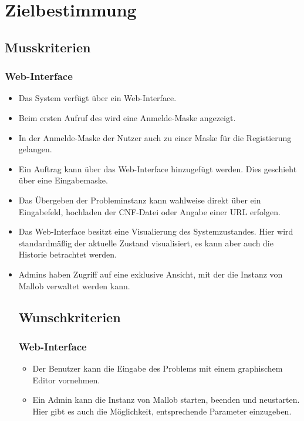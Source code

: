 \section{Zielbestimmung}
\subsection{Musskriterien}
\subsubsection{Web-Interface}
\begin{itemize}
    \item Das System verfügt über ein \gls{Web-Interface}.
    \item Beim ersten Aufruf des  wird eine Anmelde-Maske angezeigt.
    \item In der Anmelde-Maske der Nutzer auch zu einer Maske für die Registierung gelangen.
    \item Ein \gls{Auftrag} kann über das \gls{Web-Interface} hinzugefügt werden. Dies geschieht über eine Eingabemaske.
    \item Das Übergeben der Probleminstanz kann wahlweise direkt über ein Eingabefeld, hochladen der CNF-Datei oder Angabe einer URL erfolgen.
    \item Das \gls{Web-Interface} besitzt eine Visualierung des Systemzustandes. Hier wird standardmäßig der aktuelle Zustand visualisiert,  es kann aber auch die Historie betrachtet werden.
    \item Admins haben Zugriff auf eine exklusive Ansicht, mit der die Instanz von Mallob verwaltet werden kann.

\subsection{Wunschkriterien}
\subsubsection{Web-Interface}
\begin{itemize}
    \item Der Benutzer kann die Eingabe des Problems mit einem graphischem Editor vornehmen.
    \item Ein Admin kann die Instanz von Mallob starten, beenden und neustarten. Hier gibt es auch die Möglichkeit, entsprechende Parameter einzugeben.
\end{itemize}
\end{itemize}